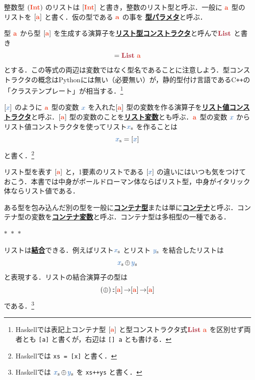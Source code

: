 \documentclass[a5paper,twoside,fleqn,draft]{jsbook}
\def\constantColor{WildStrawberry}
\def\varColor{NavyBlue}
\def\typeColor{RedOrange}
\def\typeConstColor{Maroon}
\newcommand{\separator}{\begin{center}$*$~$*$~$*$\end{center}}
\newcommand{\programminglanguage}[1]{\textsf{#1}}
\newcommand{\cxx}{\programminglanguage{C}\texttt{++}}
\newcommand{\haskell}{\programminglanguage{Haskell}}
\newcommand{\python}{\programminglanguage{Python}}
\newcommand{\keyword}[1]{{\underline{\textbf{#1}}}}
\newcommand{\code}[1]{\texttt{#1}}
\newcommand{\mSpecialTypeConstructor}[1]{\textcolor{\typeConstColor}{\textbf{#1}}}
\newcommand{\mEmptyList}{{\textcolor{\constantColor}{[\,]}}}
\newcommand{\mVar}[1]{\textcolor{\varColor}{#1}}
\newcommand{\mXVar}{\mVar{x}}
\DeclareMathOperator{\mAppend}{\oplus}
\DeclareMathOperator{\mFuncArrow}{\rightarrow}
\DeclareMathOperator{\mIn}{{:\!:}}
\newcommand{\mType}[1]{\textcolor{\typeColor}{\mathbf{#1}}}
\newcommand{\mA}{\mType{a}}
\newcommand{\mIntType}{\mType{Int}}
\DeclareMathOperator{\mListTypeConstructor}{\mSpecialTypeConstructor{List}}
\newcommand{\mTupleWith}[1]{\left(#1\right)}
\newcommand{\mList}[1]{\mVar{#1}_\mathrm{s}}
\begin{document}

整数型 $(\mIntType)$ のリストは $[\mIntType]$ と書き，整数のリスト型と呼ぶ．一般に $\mA$ 型のリストを $[\mA]$ と書く．仮の型である $\mA$ の事を \keyword{型パラメタ}と呼ぶ．

型 $\mA$ から型 $[\mA]$ を生成する演算子を\keyword{リスト型コンストラクタ}と呼んで$\mListTypeConstructor$ と書き
\begin{equation}
  [\mA]
  =\mListTypeConstructor\,\mA
\end{equation}
とする．この等式の両辺は変数ではなく型名であることに注意しよう．型コンストラクタの概念は\python には無い（必要無い）が，静的型付け言語である\cxx の「クラステンプレート」が相当する．\footnote{\haskell では表記上コンテナ型 $[\mA]$ と型コンストラクタ式$\mListTypeConstructor\,\mA $ を区別せず両者とも \code{[a]} と書くが，右辺は \code{[] a} とも書ける．}

$[\mXVar]$ のように $\mA$ 型の変数 $\mXVar$ を入れた$[\mA]$ 型の変数を作る演算子を\keyword{リスト値コンストラクタ}と呼ぶ．$[\mA]$ 型の変数のことを\keyword{リスト変数}とも呼ぶ．$\mA$ 型の変数 $\mXVar$ からリスト値コンストラクタを使ってリスト$\mList{x}$ を作ることは
\begin{equation}
  \mList{x}
  =[\mXVar]
\end{equation}
と書く．\footnote{\haskell では \code{xs = [x]} と書く．}

リスト型を表す $[\mA]$ と，1要素のリストである $[\mXVar]$ の違いにはいつも気をつけておこう．本書では中身がボールドローマン体ならばリスト型，中身がイタリック体ならリスト値である．

ある型を包み込んだ別の型を一般に\keyword{コンテナ型}または単に\keyword{コンテナ}と呼ぶ．コンテナ型の変数を\keyword{コンテナ変数}と呼ぶ．コンテナ型は多相型の一種である．


\separator

リストは\keyword{結合}できる．例えばリスト$\mList{x}$ とリスト
$\mList{y}$ を結合したリストは
\begin{equation}
  \mList{x}\mAppend\mList{y}
\end{equation}
と表現する．リストの結合演算子の型は
\begin{equation}
  (\mAppend)
  \mIn[\mA]\mFuncArrow[\mA]\mFuncArrow[\mA]
\end{equation}
である．\footnote{\haskell では $\mList{x}\mAppend\mList{y}$ を \code{xs++ys} と書く．}
\end{document}
